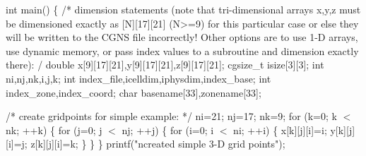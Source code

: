 \documentclass[12pt]{article}
\begin{document}
{\noindent int main()
\newline \{
\newline /*
\newline\indent   dimension statements (note that tri-dimensional arrays
\newline\indent   x,y,z must be dimensioned exactly as [N][17][21] (N>=9)
\newline\indent   for this particular case or else they will be written to
\newline\indent   the CGNS file incorrectly!  Other options are to use 1-D
\newline\indent   arrays, use dynamic memory, or pass index values to a
\newline\indent   subroutine and dimension exactly there):
\newline */
\newline\indent   double x[9][17][21],y[9][17][21],z[9][17][21];
\newline\indent   cgsize\_t isize[3][3];
\newline\indent   int ni,nj,nk,i,j,k;
\newline\indent   int index\_file,icelldim,iphysdim,index\_base;
\newline\indent   int index\_zone,index\_coord;
\newline\indent   char basename[33],zonename[33];

\noindent /* create gridpoints for simple example: */
\newline\indent  ni=21;
\newline\indent  nj=17;
\newline\indent  nk=9;
\newline\indent  for (k=0; k $<$ nk; ++k)
\newline\indent  \{
\newline\indent\indent     for (j=0; j $<$ nj; ++j)
\newline\indent\indent     \{
\newline\indent\indent\indent        for (i=0; i $<$ ni; ++i)
\newline\indent\indent\indent        \{
\newline\indent\indent\indent\indent           x[k][j][i]=i;
\newline\indent\indent\indent\indent           y[k][j][i]=j;
\newline\indent\indent\indent\indent           z[k][j][i]=k;
\newline\indent\indent\indent        \}
\newline\indent\indent     \}
\newline\indent  \}
\newline\indent printf("\texttt{}ncreated simple 3-D grid points");

}
\end{document}
